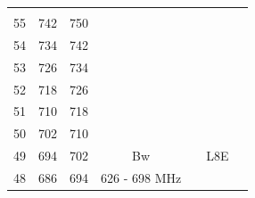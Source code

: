 \begin{longtable}[H]{|p{1cm}|p{1cm}|p{1cm}|cc|cc|}
                  \multicolumn{1}{c|}{\cellcolor[HTML]{38FFF8}} &
                   &
                   &
                   \\ \cline{1-3}
                \cellcolor[HTML]{9AFF99}55 &
                  \cellcolor[HTML]{9AFF99}742 &
                  \cellcolor[HTML]{9AFF99}750 &
                  \multicolumn{1}{c|}{\cellcolor[HTML]{38FFF8}} &
                   &
                   &
                   \\ \cline{1-3}
                \cellcolor[HTML]{9AFF99}54 &
                  \cellcolor[HTML]{9AFF99}734 &
                  \cellcolor[HTML]{9AFF99}742 &
                  \multicolumn{1}{c|}{\cellcolor[HTML]{38FFF8}} &
                   &
                   &
                   \\ \cline{1-3}
                \cellcolor[HTML]{9AFF99}53 &
                  \cellcolor[HTML]{9AFF99}726 &
                  \cellcolor[HTML]{9AFF99}734 &
                  \multicolumn{1}{c|}{\cellcolor[HTML]{38FFF8}} &
                   &
                   &
                   \\ \cline{1-3}
                \cellcolor[HTML]{9AFF99}52 &
                  \cellcolor[HTML]{9AFF99}718 &
                  \cellcolor[HTML]{9AFF99}726 &
                  \multicolumn{1}{c|}{\cellcolor[HTML]{38FFF8}} &
                   &
                   &
                   \\ \cline{1-4}
                \cellcolor[HTML]{9AFF99}51 &
                  \cellcolor[HTML]{9AFF99}710 &
                  \cellcolor[HTML]{9AFF99}718 &
                   &
                   &
                   &
                   \\ \cline{1-3}
                \cellcolor[HTML]{9AFF99}50 &
                  \cellcolor[HTML]{9AFF99}702 &
                  \cellcolor[HTML]{9AFF99}710 &
                   &
                   &
                   &
                   \\ \cline{1-4} \cline{6-6}
                \cellcolor[HTML]{9AFF99}49 &
                  \cellcolor[HTML]{9AFF99}694 &
                  \cellcolor[HTML]{9AFF99}702 &
                  \multicolumn{1}{c|}{\cellcolor[HTML]{FCFF2F}Bw} &
                   &
                  \multicolumn{1}{c|}{\cellcolor[HTML]{FCFF2F}L8E} &
                   \\ \cline{1-3}
                \cellcolor[HTML]{9AFF99}48 &
                  \cellcolor[HTML]{9AFF99}686 &
                  \cellcolor[HTML]{9AFF99}694 &
                  \multicolumn{1}{c|}{\cellcolor[HTML]{FCFF2F}626 - 698 MHz} &

\end{longtable}
